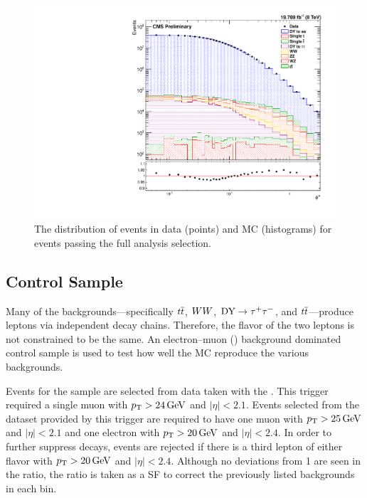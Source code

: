 \begin{figure}[!htbp]
    \centering
    \includegraphics[width=\textwidth]{figures/phistar.pdf}
    \caption[
        The \phistar distribution of events in data and MC.
    ]{
        The \phistar distribution of events in data (points) and MC
        (histograms) for events passing the full analysis selection.
    }
    \label{fig:phistar_background}
\end{figure}

\subsection{\emu Control Sample}

Many of the backgrounds---specifically $t\overline{t}$, $WW$, $\text{DY} \to \tau^{+} \tau^{-}$, and
$t\overline{t}$---produce leptons via independent decay chains. Therefore, the flavor
of the two leptons is not constrained to be the same. An electron--muon
(\emu) background dominated control sample is used to test how well the MC
reproduce the various backgrounds.

Events for the \emu sample are selected from data taken with the
\SingleMuonTrigger. This trigger required a single muon with $p_{\mathrm{T}} > 24 \,\text{Ge\hspace{-.08em}V}$
and $|\eta| < 2.1$. Events selected from the dataset provided by this trigger
are required to have one muon with $p_{\mathrm{T}} > 25 \,\text{Ge\hspace{-.08em}V}$ and $|\eta| < 2.1$ and one
electron with $p_{\mathrm{T}} > 20 \,\text{Ge\hspace{-.08em}V}$ and $|\eta| < 2.4$. In order to further suppress
\Z decays, events are rejected if there is a third lepton of either flavor with
$p_{\mathrm{T}} > 20 \,\text{Ge\hspace{-.08em}V}$ and $|\eta| < 2.4$.  Although no
deviations from \num{1} are seen in the ratio, the ratio is taken as a SF to
correct the previously listed backgrounds in each bin.

